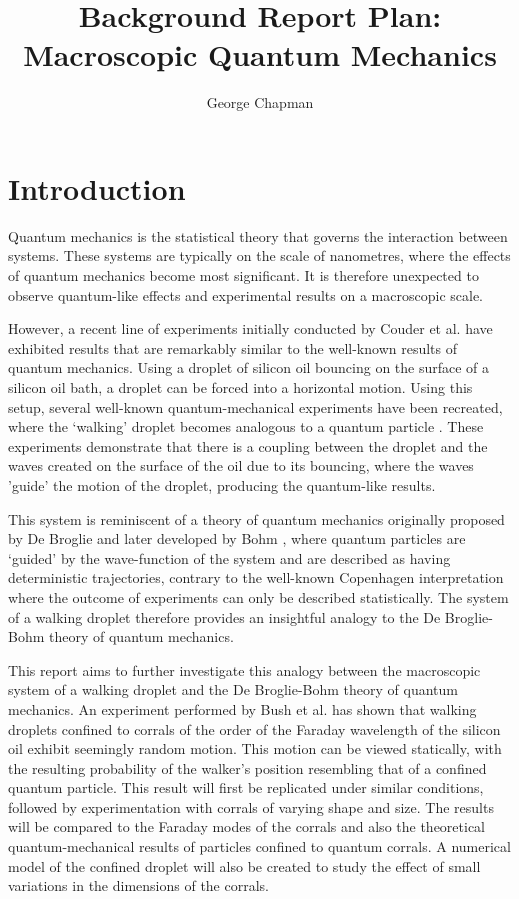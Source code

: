 \documentclass[11pt]{article}
\author{George Chapman}
\title{Background Report Plan: Macroscopic Quantum Mechanics}
\begin{document}
\maketitle

\section{Introduction}
\label{sec:introduction}

Quantum mechanics is the statistical theory that governs the interaction between systems.  These systems are typically on the scale of nanometres, where the effects of quantum mechanics become most significant.  It is therefore unexpected to observe quantum-like effects and experimental results on a macroscopic scale.

However, a recent line of experiments initially conducted by Couder et al.\cite{1} have exhibited results that are remarkably similar to the well-known results of quantum mechanics.  Using a droplet of silicon oil bouncing on the surface of a silicon oil bath, a droplet can be forced into a horizontal motion.  Using this setup, several well-known quantum-mechanical experiments have been recreated, where the `walking' droplet becomes analogous to a quantum particle \cite{1,6,7}.  These experiments demonstrate that there is a coupling between the droplet and the waves created on the surface of the oil due to its bouncing, where the waves 'guide' the motion of the droplet, producing the quantum-like results.

This system is reminiscent of a theory of quantum mechanics originally proposed by De Broglie and later developed by Bohm \cite{17}, where quantum particles are `guided' by the wave-function of the system and are described as having deterministic trajectories, contrary to the well-known Copenhagen interpretation where the outcome of experiments can only be described statistically.  The system of a walking droplet therefore provides an insightful analogy to the De Broglie-Bohm theory of quantum mechanics.

This report aims to further investigate this analogy between the macroscopic system of a walking droplet and the De Broglie-Bohm theory of quantum mechanics.  An experiment performed by Bush et al.\cite{12} has shown that walking droplets confined to corrals of the order of the Faraday wavelength of the silicon oil exhibit seemingly random motion.  This motion can be viewed statically, with the resulting probability of the walker's position resembling that of a confined quantum particle.  This result will first be replicated under similar conditions, followed by experimentation with corrals of varying shape and size.  The results will be compared to the Faraday modes of the corrals and also the theoretical quantum-mechanical results of particles confined to quantum corrals.  A numerical model of the confined droplet will also be created to study the effect of small variations in the dimensions of the corrals.
\end{document}
